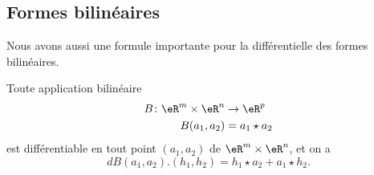 \subsection{Formes bilinéaires}

Nous avons aussi une formule importante pour la différentielle des formes bilinéaires.
\begin{lemma}\label{bilin_diff}
	Toute application bilinéaire
	\begin{equation}
		\begin{aligned}
			B\colon \eR^m\times\eR^n & \to \eR^p      \\
			B(a_1,a_2)               & =a_1 \star a_2
		\end{aligned}
	\end{equation}
	est différentiable en tout point \( (a_1,a_2)\) de \( \eR^m\times\eR^n\), et on a
	\[
		dB(a_1,a_2).(h_1,h_2)=h_1\star a_2 + a_1\star h_2.
	\]
\end{lemma}
